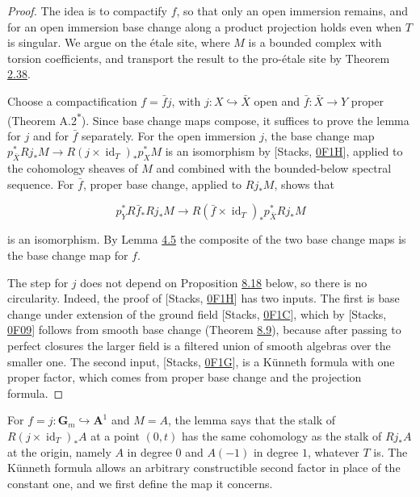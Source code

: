 \documentclass[11pt]{article}
\newcommand{\bpout}[1]{#1\textsuperscript{\hyperlink{bp-outside}{\ensuremath{\ast}}}}
\begin{document}
\begin{proof}[{Proof}]\label{bp688}%
The idea is to compactify \(f\), so that only an open immersion remains, and for an open immersion base change along a product projection holds even when \(T\) is singular. We argue on the étale site, where \(M\) is a bounded complex with torsion coefficients, and transport the result to the pro-étale site by Theorem \hyperref[bp113]{2.38}.

Choose a compactification \(f=\bar f j\), with \(j:X\hookrightarrow\bar X\) open and \(\bar f:\bar X\to Y\) proper (Theorem \bpout{A.2}). Since base change maps compose, it suffices to prove the lemma for \(j\) and for \(\bar f\) separately. For the open immersion \(j\), the base change map \(p_{\bar X}^*Rj_*M\to R(j\times\operatorname{id}_T)_*p_X^*M\) is an isomorphism by [Stacks, \href{https://stacks.math.columbia.edu/tag/0F1H}{0F1H}], applied to the cohomology sheaves of \(M\) and combined with the bounded-below spectral sequence. For \(\bar f\), proper base change, applied to \(Rj_*M\), shows that

\[
p_Y^*R\bar f_*Rj_*M\longrightarrow
R(\bar f\times\operatorname{id}_T)_*p_{\bar X}^*Rj_*M
\]

is an isomorphism. By Lemma \hyperref[bp299]{4.5} the composite of the two base change maps is the base change map for \(f\).

The step for \(j\) does not depend on Proposition \hyperref[bp700]{8.18} below, so there is no circularity. Indeed, the proof of [Stacks, \href{https://stacks.math.columbia.edu/tag/0F1H}{0F1H}] has two inputs. The first is base change under extension of the ground field [Stacks, \href{https://stacks.math.columbia.edu/tag/0F1C}{0F1C}], which by [Stacks, \href{https://stacks.math.columbia.edu/tag/0F09}{0F09}] follows from smooth base change (Theorem \hyperref[bp674]{8.9}), because after passing to perfect closures the larger field is a filtered union of smooth algebras over the smaller one. The second input, [Stacks, \href{https://stacks.math.columbia.edu/tag/0F1G}{0F1G}], is a Künneth formula with one proper factor, which comes from proper base change and the projection formula.
\end{proof}

\label{bp689}%
For \(f=j:\mathbf G_m\hookrightarrow\mathbf A^1\) and \(M=A\), the lemma says that the stalk of \(R(j\times\operatorname{id}_T)_*A\) at a point \((0,t)\) has the same cohomology as the stalk of \(Rj_*A\) at the origin, namely \(A\) in degree \(0\) and \(A(-1)\) in degree \(1\), whatever \(T\) is. The Künneth formula allows an arbitrary constructible second factor in place of the constant one, and we first define the map it concerns.
\end{document}

